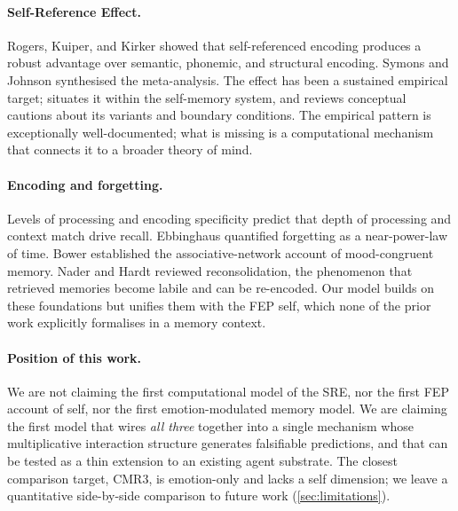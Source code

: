 \paragraph{Self-Reference Effect.}
Rogers, Kuiper, and Kirker \cite{rogers1977sre} showed that
self-referenced encoding produces a robust advantage over semantic,
phonemic, and structural encoding. Symons and Johnson \cite{symons1997meta}
synthesised the meta-analysis. The effect has been a sustained empirical target;
\cite{conway2005smemsys} situates it within the self-memory system,
and \cite{klein2012selfref} reviews conceptual cautions about its
variants and boundary conditions. The empirical pattern is
exceptionally well-documented; what is missing is a computational
mechanism that connects it to a broader theory of mind.

\paragraph{Encoding and forgetting.}
Levels of processing \cite{craik1972lop} and encoding specificity
\cite{tulving1973encodingspec} predict that depth of processing and
context match drive recall. Ebbinghaus \cite{ebbinghaus1885forgetting}
quantified forgetting as a near-power-law of time. Bower
\cite{bower1981mood} established the associative-network account of
mood-congruent memory. Nader and Hardt \cite{nader2011reconsolidation}
reviewed reconsolidation, the phenomenon that retrieved memories become
labile and can be re-encoded. Our model builds on these foundations but
unifies them with the FEP self, which none of the prior work
explicitly formalises in a memory context.

\paragraph{Position of this work.}
We are not claiming the first computational model of the SRE, nor the
first FEP account of self, nor the first emotion-modulated memory model.
We are claiming the first model that wires \emph{all three} together
into a single mechanism whose multiplicative interaction structure
generates falsifiable predictions, and that can be tested as a thin
extension to an existing agent substrate. The closest comparison
target, CMR3, is emotion-only and lacks a self dimension; we leave a
quantitative side-by-side comparison to future work
(\cref{sec:limitations}).
